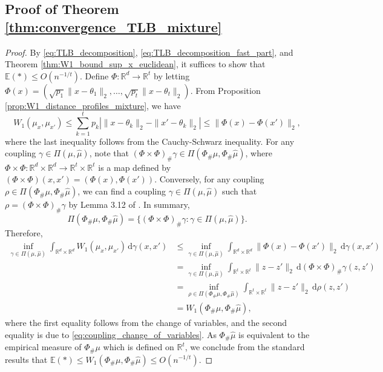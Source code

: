 \documentclass[11pt,letterpaper]{article}
\theoremstyle{definition}
\numberwithin{equation}{section}
\newcommand{\R}{\mathbb{R}}
\newcommand{\E}{\mathbb{E}} %
\begin{document}
\subsection{Proof of Theorem \ref{thm:convergence_TLB_mixture}}
\begin{proof}
    By \eqref{eq:TLB_decomposition}, \eqref{eq:TLB_decomposition_fast_part}, and Theorem \ref{thm:W1_bound_sup_x_euclidean}, it suffices to show that $\E(*) \le O(n^{-1 / t})$. Define $\Phi \colon \R^d \to \R^t$ by letting $\Phi(x) = \left(\sqrt{p_1} \|x - \theta_1\|_2, \ldots, \sqrt{p_t} \|x - \theta_t\|_2\right)$. From Proposition \ref{prop:W1_distance_profiles_mixture}, we have
    \begin{equation*}
        W_1(\mu_x, \mu_{x'}) \le \sum_{k = 1}^{t} p_k \left|\|x - \theta_k\|_2 - \|x' - \theta_k\|_2\right| \le \|\Phi(x) - \Phi(x')\|_2,
    \end{equation*}
    where the last inequality follows from the Cauchy-Schwarz inequality. For any coupling $\gamma \in \Pi(\mu, \hat{\mu})$, note that $(\Phi \times \Phi)_\# \gamma \in \Pi(\Phi_\# \mu, \Phi_\# \hat{\mu})$, where $\Phi \times \Phi \colon \R^d \times \R^d \to \R^t \times \R^t$ is a map defined by $(\Phi \times \Phi)(x, x') = (\Phi(x), \Phi(x'))$. Conversely, for any coupling $\rho \in \Pi(\Phi_\# \mu, \Phi_\# \hat{\mu})$, we can find a coupling $\gamma \in \Pi(\mu, \hat{\mu})$ such that $\rho = (\Phi \times \Phi)_\# \gamma$ by Lemma 3.12 of \cite{Ambrosio2013}. In summary, 
    \begin{equation}
        \label{eq:coupling_change_of_variables}
        \Pi(\Phi_\# \mu, \Phi_\# \hat{\mu}) = \{(\Phi \times \Phi)_\# \gamma : \gamma \in \Pi(\mu, \hat{\mu})\}.
    \end{equation}
    Therefore,
    \begin{equation*}
        \begin{split}
            \inf_{\gamma \in \Pi(\mu, \hat{\mu})} \int_{\R^d \times \R^d} W_1(\mu_x, \mu_{x'}) \, \mathrm{d} \gamma(x, x') 
            & \le \inf_{\gamma \in \Pi(\mu, \hat{\mu})} \int_{\R^d \times \R^d} \|\Phi(x) - \Phi(x')\|_2 \, \mathrm{d} \gamma(x, x') \\
            & = \inf_{\gamma \in \Pi(\mu, \hat{\mu})} \int_{\R^t \times \R^t} \|z - z'\|_2 \, \mathrm{d} (\Phi \times \Phi)_\# \gamma(z, z')\\
            & = \inf_{\rho \in \Pi(\Phi_\# \mu, \Phi_\# \hat{\mu})} \int_{\R^t \times \R^t} \|z - z'\|_2 \, \mathrm{d} \rho(z, z') \\
            & = W_1(\Phi_\# \mu, \Phi_\# \hat{\mu}),
        \end{split}
    \end{equation*}
    where the first equality follows from the change of variables, and the second equality is due to \eqref{eq:coupling_change_of_variables}. As $\Phi_\# \hat{\mu}$ is equivalent to the empirical measure of $\Phi_\# \mu$ which is defined on $\R^t$, we conclude from the standard results \citep{dudley1969speed,fournier2015rate} that $\E(*) \le W_1(\Phi_\# \mu, \Phi_\# \hat{\mu}) \le O(n^{-1 / t})$.
\end{proof}
\end{document}
